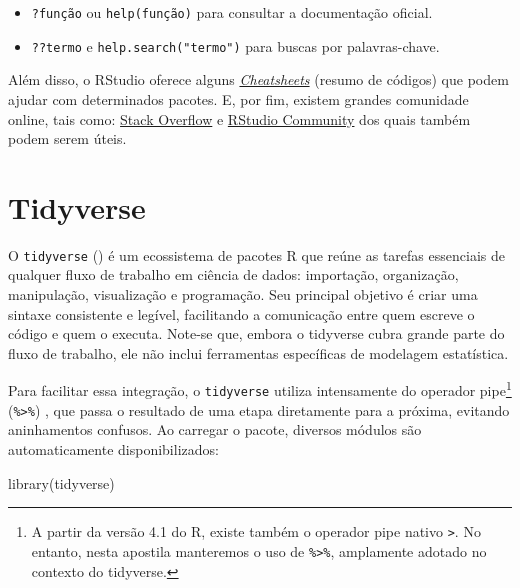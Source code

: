 \documentclass[
  12pt,
  letterpaper,
  DIV=11,
  numbers=noendperiod]{scrreprt}
\newenvironment{Shaded}{\begin{snugshade}}{\end{snugshade}}
\newcommand{\FunctionTok}[1]{\textcolor[rgb]{0.28,0.35,0.67}{#1}}
\newcommand{\NormalTok}[1]{\textcolor[rgb]{0.00,0.23,0.31}{#1}}
\providecommand{\tightlist}{%
  \setlength{\itemsep}{0pt}\setlength{\parskip}{0pt}}\usepackage{longtable,booktabs,array}
\begin{document}
\begin{itemize}
\tightlist
\item
  \texttt{?função} ou \texttt{help(função)} para consultar a
  documentação oficial.
\item
  \texttt{??termo} e \texttt{help.search("termo")} para buscas por
  palavras-chave.
\end{itemize}

Além disso, o RStudio oferece alguns
\href{https://rstudio.com/resources/cheatsheets/}{\emph{Cheatsheets}}
(resumo de códigos) que podem ajudar com determinados pacotes. E, por
fim, existem grandes comunidade online, tais como:
\href{https://stackoverflow.com/collectives/r-language}{Stack Overflow}
e \href{https://forum.posit.co/}{RStudio Community} dos quais também
podem serem úteis.

\chapter{Tidyverse}\label{tidyverse}

O \texttt{tidyverse} () é um ecossistema de pacotes R que reúne as tarefas
essenciais de qualquer fluxo de trabalho em ciência de dados:
importação, organização, manipulação, visualização e programação. Seu
principal objetivo é criar uma sintaxe consistente e legível,
facilitando a comunicação entre quem escreve o código e quem o executa.
Note-se que, embora o tidyverse cubra grande parte do fluxo de trabalho,
ele não inclui ferramentas específicas de modelagem estatística.

Para facilitar essa integração, o \texttt{tidyverse} utiliza
intensamente do operador pipe\footnote{A partir da versão 4.1 do R,
  existe também o operador pipe nativo
  \texttt{\textbar{}\textgreater{}}. No entanto, nesta apostila
  manteremos o uso de \texttt{\%\textgreater{}\%}, amplamente adotado no
  contexto do tidyverse.} (\texttt{\%\textgreater{}\%}) , que passa o
resultado de uma etapa diretamente para a próxima, evitando aninhamentos
confusos. Ao carregar o pacote, diversos módulos são automaticamente
disponibilizados:

\begin{Shaded}
\begin{Highlighting}[]
\FunctionTok{library}\NormalTok{(tidyverse)}
\end{Highlighting}
\end{Shaded}
\end{document}
